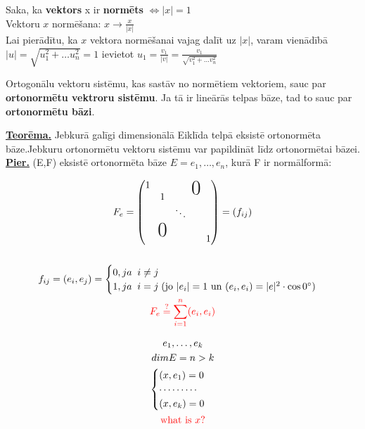 \documentclass[12pt]{article}
\begin{document}
\begin{definition} Saka, ka \textbf{vektors} x ir \textbf{normēts}  $\Leftrightarrow |x| = 1 $ \\
	Vektoru $x$ normēšana:  $ x \rightarrow \frac{x}{|x|} $ \\ 
	Lai pierādītu, ka $x$ vektora normēšanai vajag dalīt uz $|x|$, varam vienādībā
	$|u| = \sqrt{u_1^2 + \ldots u_n^2} = 1$ ievietot $u_1 = \frac{v_1}{|v|} = \frac{v_1}{ \sqrt{v_1^2 + \ldots v_n^2}}$
\end{definition}

\begin{definition} Ortogonālu vektoru sistēmu,  kas sastāv no normētiem vektoriem, sauc par \textbf{ortonormētu vektroru sistēmu}. Ja tā ir lineārās telpas bāze, tad to sauc par \textbf{ortonormētu bāzi}. 
\end{definition}

\pagebreak 

\textbf{\underline{Teorēma.}} Jebkurā galīgi dimensionālā Eiklīda telpā eksistē ortonormēta bāze.Jebkuru ortonormētu vektoru sistēmu var papildināt līdz ortonormētai bāzei. \\

\textbf{\underline{Pier.}}  (E,F) eksistē ortonormēta bāze $E = e_1, \ldots, e_n$, kurā  F ir normālformā: 

\begin{gather*}
	F_e = 
	\begin{pmatrix}
	1 & && \bigzero   \\ 
    	& 1 &  \\
	& &  \ddots  &\\ 
        & \bigzero  &  \\
    	& &  & &  1  \\ 	
    \end{pmatrix}
    = (f_{ij}) \\ \\ 
    f_{ij} = (e_i, e_j) = 
    \begin{cases}
	0, ja \; \;  i \neq j \\
	1, ja \; \; i = j  \; (\text{jo } |e_i| = 1 \text{ un } (e_i, e_i) = |e|^2 \cdot \cos 0^\circ)
     \end{cases}
     \\
     \color{red}{F_e \stackrel{?}{=} \sum^n_{i = 1} (e_i, e_i)}
\end{gather*}


\begin{gather*}
	e_1, \ldots, e_k \\
	dim E = n > k \\
	\begin{cases}
		(x, e_1) = 0 \\ 
		\cdots \cdots \cdots \\ 
 		(x, e_k) = 0
	\end{cases} \\
	\color{red}{\text{what is } x?}
\end{gather*}
\end{document}
